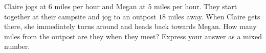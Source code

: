 Claire jogs at $6$ miles per hour and Megan at $5$ miles per hour. They start together at their campsite and jog to an outpost $18$ miles away. When Claire gets there, she immediately turns around and heads back towards Megan. How many miles from the outpost are they when they meet? Express your answer as a mixed number.
